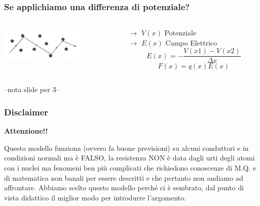 		
		\begin{frame}[c]\frametitle{Se applichiamo una differenza di potenziale?}
			\begin{columns}
				\begin{column}{0.4\textwidth}
					\includegraphics[width=4cm]{./img/path.png}
				\end{column}
				\begin{column}{0.7\textwidth}

					$\longrightarrow$ $V(x)$ Potenziale\\
					$\longrightarrow$ $E(x)$ Campo Elettrico
					\[
					 E (x) = - \frac{V(x1)-V(x2)}{\Delta x}
					\]
					\[
					 F \left(x\right) = q \left(x\right) E(x)
					\]

				\end{column}
			\end{columns}
			--nota slide per 3--
		\end{frame}

		\begin{frame}[c]\frametitle{Disclaimer}
		    
		\begin{center}
			\color{red}\textbf{Attenzione!!}
		\end{center}
		Questo modello funziona (ovvero fa buone previsioni) su alcuni conduttori e in condizioni normali ma è FALSO, la resistenza NON è data dagli urti degli atomi con i nuclei ma fenomeni ben più complicati che richiedono conoscenze di M.Q. e di matematica non banali per essere descritti e che pertanto non andiamo ad affrontare. Abbiamo scelto questo modello perché ci è sembrato, dal punto di vista didattico il miglior modo per introdurre l'argomento.		
		\end{frame}

